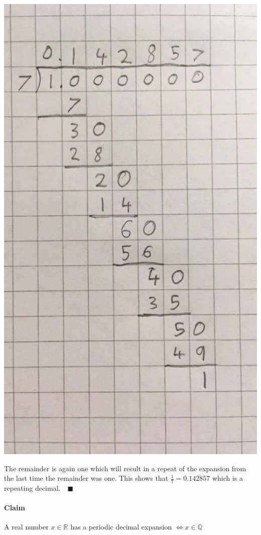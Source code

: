 \documentclass{article}
\newcommand{\bb}[1]{\mathbb{#1}}
\begin{document}
\begin{center}
\includegraphics[scale=0.3, trim= 0.6cm 4.6cm 3cm 2.8cm, clip]{1dividedby7}
\end{center}

The remainder is again one which will result in a repeat of the expansion from the last time the remainder was one. This shows that \(\frac 17=0.\overline{142857}\) which is a repeating decimal.\(\quad\blacksquare\)

\paragraph{Claim} A real number \(x\in\bb R\) has a periodic decimal expansion \(\iff x\in\bb Q\)
\end{document}
